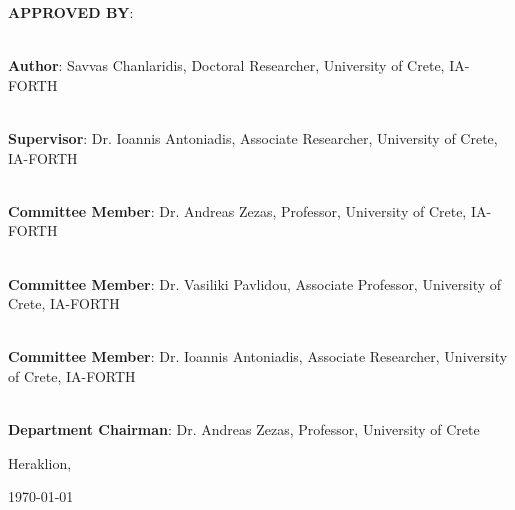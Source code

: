 \documentclass[a4paper, 10pt, twoside]{book}
\begin{document}
    \noindent \textbf{APPROVED BY}:\\
    \vspace*{1.5cm}
    
    \noindent\hrulefill \\
    \noindent\textbf{Author}: Savvas Chanlaridis, Doctoral Researcher, University of Crete, IA-FORTH \\
    \vspace*{1cm}
    
    \noindent\hrulefill \\
    \noindent\textbf{Supervisor}: Dr. Ioannis Antoniadis, Associate Researcher, University of Crete, IA-FORTH \\
    \vspace*{1cm}    
    
    \noindent\hrulefill \\
    \noindent\textbf{Committee Member}: Dr. Andreas Zezas, Professor, University of Crete, IA-FORTH \\
    \vspace*{1cm}    
    
    \noindent\hrulefill \\
    \noindent\textbf{Committee Member}: Dr. Vasiliki Pavlidou, Associate Professor, University of Crete, IA-FORTH \\
    \vspace*{1cm}    
    
    \noindent\hrulefill \\
    \noindent\textbf{Committee Member}: Dr. Ioannis Antoniadis, Associate Researcher, University of Crete, IA-FORTH \\
    \vspace*{1cm}    
    
    \noindent\hrulefill \\
    \noindent\textbf{Department Chairman}: Dr. Andreas Zezas, Professor, University of Crete \\
    \vspace*{1cm}  
    
    \begin{center}
        \vspace*{\fill}
        Heraklion, \date{}{\today}
    \end{center}

    \newpage  %
    \mbox{}
    \thispagestyle{empty}
\end{document}
